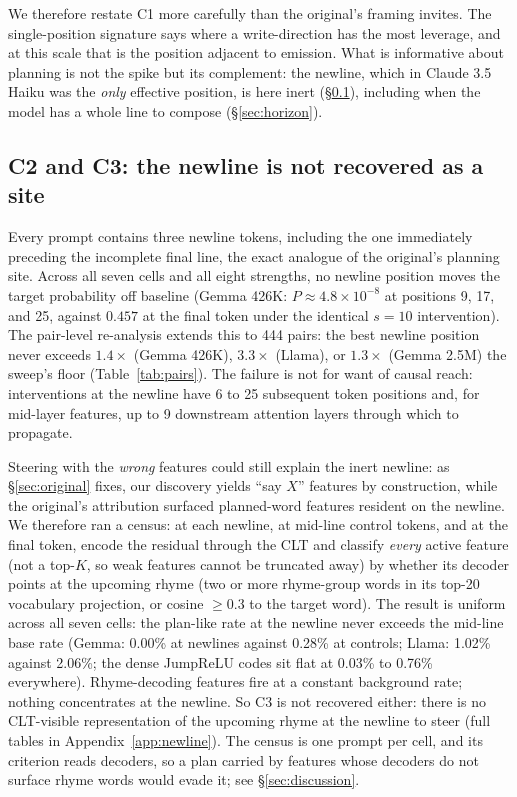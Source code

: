 \documentclass[11pt]{article}
\begin{document}
We therefore restate C1 more carefully than the original's framing invites. The single-position signature says where a write-direction has the most leverage, and at this scale that is the position adjacent to emission. What is informative about planning is not the spike but its complement: the newline, which in Claude 3.5 Haiku was the \emph{only} effective position, is here inert (\S\ref{sec:site}), including when the model has a whole line to compose (\S\ref{sec:horizon}).

\subsection{C2 and C3: the newline is not recovered as a site}
\label{sec:site}

Every prompt contains three newline tokens, including the one immediately preceding the incomplete final line, the exact analogue of the original's planning site. Across all seven cells and all eight strengths, no newline position moves the target probability off baseline (Gemma 426K: $P\approx4.8\times10^{-8}$ at positions 9, 17, and 25, against $0.457$ at the final token under the identical $s{=}10$ intervention). The pair-level re-analysis extends this to 444 pairs: the best newline position never exceeds $1.4\times$ (Gemma 426K), $3.3\times$ (Llama), or $1.3\times$ (Gemma 2.5M) the sweep's floor (Table~\ref{tab:pairs}). The failure is not for want of causal reach: interventions at the newline have 6 to 25 subsequent token positions and, for mid-layer features, up to 9 downstream attention layers through which to propagate.

Steering with the \emph{wrong} features could still explain the inert newline: as \S\ref{sec:original} fixes, our discovery yields ``say $X$'' features by construction, while the original's attribution surfaced planned-word features resident on the newline. We therefore ran a census: at each newline, at mid-line control tokens, and at the final token, encode the residual through the CLT and classify \emph{every} active feature (not a top-$K$, so weak features cannot be truncated away) by whether its decoder points at the upcoming rhyme (two or more rhyme-group words in its top-20 vocabulary projection, or cosine $\geq0.3$ to the target word). The result is uniform across all seven cells: the plan-like rate at the newline never exceeds the mid-line base rate (Gemma: 0.00\% at newlines against 0.28\% at controls; Llama: 1.02\% against 2.06\%; the dense JumpReLU codes sit flat at 0.03\% to 0.76\% everywhere). Rhyme-decoding features fire at a constant background rate; nothing concentrates at the newline. So C3 is not recovered either: there is no CLT-visible representation of the upcoming rhyme at the newline to steer (full tables in Appendix~\ref{app:newline}). The census is one prompt per cell, and its criterion reads decoders, so a plan carried by features whose decoders do not surface rhyme words would evade it; see \S\ref{sec:discussion}.
\end{document}
